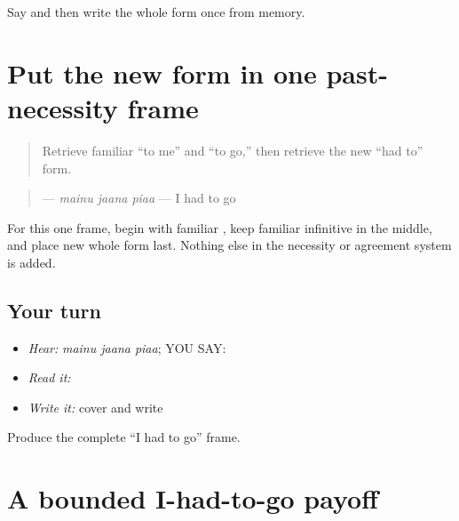 \begin{tcolorbox}[breakable,colback=teal!4,colframe=teal!35!black,title={Before you move on}]
Say and then write the whole form once from memory.
\end{tcolorbox}
\section[\texorpdfstring{\pa{ਮੈਨੂੰ} \pa{ਜਾਣਾ} \pa{ਪਿਆ} (mainu jaana piaa)}{ਮੈਨੂੰ ਜਾਣਾ ਪਿਆ (mainu jaana piaa)}]{Put the new form in one past-necessity frame}

\label{lesson:PA-C208-had-to-go}



\begin{quote}
Retrieve familiar “to me” and “to go,” then retrieve the new “had to” form.
\end{quote}

\begin{grammarlens}[title={Grammar Lens}]
\begin{quote}
\textbf{  } — \emph{mainu jaana piaa} — I had to go
\end{quote}

For this one frame, begin with familiar \textbf{}, keep familiar infinitive \textbf{} in the middle, and place new whole form \textbf{} last. Nothing else in the necessity or agreement system is added.
\end{grammarlens}

\subsection*{Your turn}
\begin{itemize}
\raggedright
  \item \emph{Hear:} \emph{mainu jaana piaa}; YOU SAY: \textbf{  }
  \item \emph{Read it:} \textbf{  }
  \item \emph{Write it:} cover and write \textbf{  }
\end{itemize}

\begin{tcolorbox}[breakable,colback=teal!4,colframe=teal!35!black,title={Before you move on}]
Produce the complete “I had to go” frame.
\end{tcolorbox}
\section[\texorpdfstring{\pa{ਮੈਨੂੰ} \pa{ਜਾਣਾ} \pa{ਪਿਆ} (mainu jaana piaa)}{ਮੈਨੂੰ ਜਾਣਾ ਪਿਆ (mainu jaana piaa)}]{A bounded I-had-to-go payoff}

